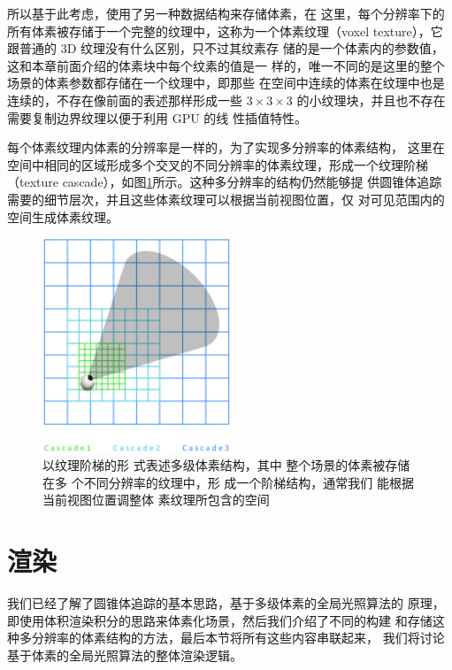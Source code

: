 所以基于此考虑，\cite{a:TheTechnologyofTheTomorrowChildren}使用了另一种数据结构来存储体素，在 这里，每个分辨率下的所有体素被存储于一个完整的纹理中，这称为一个体素纹理（voxel texture），它跟普通的 3D 纹理没有什么区别，只不过其纹素存 储的是一个体素内的参数值，这和本章前面介绍的体素块中每个纹素的值是一 样的，唯一不同的是这里的整个场景的体素参数都存储在一个纹理中，即那些 在空间中连续的体素在纹理中也是连续的，不存在像前面的表述那样形成一些 $3\times  3\times  3$ 的小纹理块，并且也不存在需要复制边界纹理以便于利用 GPU 的线 性插值特性。

每个体素纹理内体素的分辨率是一样的，为了实现多分辨率的体素结构， 这里在空间中相同的区域形成多个交叉的不同分辨率的体素纹理，形成一个纹理阶梯（texture cascade），如图\ref{f:vct-texture-cascaded}所示。这种多分辨率的结构仍然能够提 供圆锥体追踪需要的细节层次，并且这些体素纹理可以根据当前视图位置，仅 对可见范围内的空间生成体素纹理。

\begin{figure}
	\sidecaption
	\includegraphics[width=0.5\textwidth]{figures/vct/texture-cascaded}
	\caption{以纹理阶梯的形 式表述多级体素结构，其中 整个场景的体素被存储在多 个不同分辨率的纹理中，形 成一个阶梯结构，通常我们 能根据当前视图位置调整体 素纹理所包含的空间}
	\label{f:vct-texture-cascaded}
\end{figure}




\section{渲染}\label{sec:vct-rendering}
我们已经了解了圆锥体追踪的基本思路，基于多级体素的全局光照算法的 原理，即使用体积渲染积分的思路来体素化场景，然后我们介绍了不同的构建 和存储这种多分辨率的体素结构的方法，最后本节将所有这些内容串联起来， 我们将讨论基于体素的全局光照算法的整体渲染逻辑。

